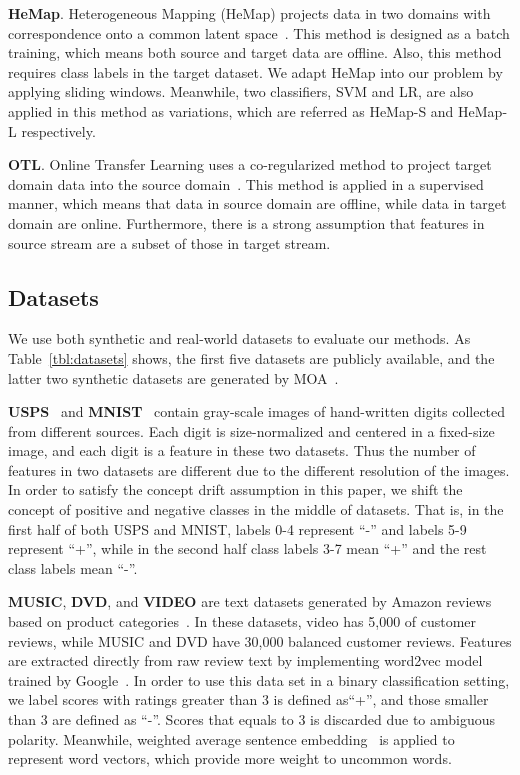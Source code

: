 \textbf{HeMap}. Heterogeneous Mapping (HeMap) projects data in two domains with correspondence onto a common latent space~\cite{shi2010transfer}. This method is designed as a batch training, which means both source and target data are offline. Also, this method requires class labels in the target dataset. We adapt HeMap into our problem by applying sliding windows. Meanwhile, two classifiers, SVM and LR, are also applied in this method as variations, which are referred as HeMap-S and HeMap-L respectively. 

\textbf{OTL}. Online Transfer Learning uses a co-regularized method to project target domain data into the source domain~\cite{zhao2010otl}. This method is applied in a supervised manner, which means that data in source domain are offline, while data in target domain are online. Furthermore, there is a strong assumption that features in source stream are a subset of those in target stream.

\subsection{Datasets}
\label{sec:datasets}




We use both synthetic and real-world datasets to evaluate our methods. As Table~\ref{tbl:datasets} shows, the first five datasets are publicly available, and the latter two synthetic datasets are generated by MOA~\cite{bifet2010moa}. 

\textbf{USPS}~\cite{hull1994database} and \textbf{MNIST}~\cite{lecun1998gradient} contain gray-scale images of hand-written digits collected from different sources. 
Each digit is size-normalized and centered in a fixed-size image, and each digit is a feature in these two datasets. Thus the number of features in two datasets are different due to the different resolution of the images.
In order to satisfy the concept drift assumption in this paper, we shift the concept of positive and negative classes in the middle of datasets. 
That is, in the first half of both USPS and MNIST, labels 0-4 represent ``-'' and labels 5-9 represent ``+'', while in the second half class labels 3-7 mean ``+'' and the rest class labels mean ``-''.

\textbf{MUSIC}, \textbf{DVD}, and \textbf{VIDEO} are text datasets generated by Amazon reviews based on product categories~\cite{blitzer2007biographies}. In these datasets, video has 5,000 of customer reviews, while MUSIC and DVD have 30,000 balanced customer reviews. Features are extracted directly from raw review text by implementing word2vec model trained by Google~\cite{mikolov2013efficient}. In order to use this data set in a binary classification setting, we label scores with ratings greater than 3 is defined as``+'', and those smaller than 3 are defined as ``-''. Scores that equals to 3 is discarded due to ambiguous polarity. Meanwhile, weighted average sentence embedding~\cite{arora2016simple} is applied to represent word vectors, which provide more weight to uncommon words.

